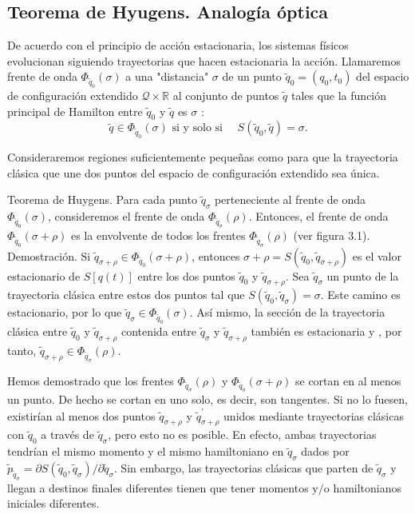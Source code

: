 \subsection{Teorema de Hyugens. Analogía óptica}
De acuerdo con el principio de acción estacionaria, los sistemas físicos evolucionan siguiendo trayectorias que hacen estacionaria la acción. Llamaremos frente de onda $\Phi_{\tilde{q}_{0}}(\sigma)$ a una "distancia" $\sigma$ de un punto $\tilde{q}_{0}=\left(q_{0}, t_{0}\right)$ del espacio de configuración extendido $\mathscr{Q} \times \mathbb{R}$ al conjunto de puntos $\tilde{q}$ tales que la función principal de Hamilton entre $\tilde{q}_{0}$ y $\tilde{q}$ es $\sigma$ :
$$
\tilde{q} \in \Phi_{\tilde{q}_{0}}(\sigma) \text { si y solo si } \quad S\left(\tilde{q}_{0}, \tilde{q}\right)=\sigma .
$$

Consideraremos regiones suficientemente pequeñas como para que la trayectoria clásica que une dos puntos del espacio de configuración extendido sea única.

Teorema de Huygens. Para cada punto $\tilde{q}_{\sigma}$ perteneciente al frente de onda $\Phi_{\tilde{q}_{0}}(\sigma)$, consideremos el frente de onda $\Phi_{\tilde{q}_{\sigma}}(\rho)$. Entonces, el frente de onda $\Phi_{\tilde{q}_{0}}(\sigma+\rho)$ es la envolvente de todos los frentes $\Phi_{\tilde{q}_{\sigma}}(\rho)$ (ver figura 3.1).
Demostración. Si $\tilde{q}_{\sigma+\rho} \in \Phi_{\tilde{q}_{0}}(\sigma+\rho)$, entonces $\sigma+\rho=S\left(\tilde{q}_{0}, \tilde{q}_{\sigma+\rho}\right)$ es el valor estacionario de $S[q(t)]$ entre los dos puntos $\tilde{q}_{0}$ y $\tilde{q}_{\sigma+\rho}$. Sea $\tilde{q}_{\sigma}$ un punto de la
trayectoria clásica entre estos dos puntos tal que $S\left(\tilde{q}_{0}, \tilde{q}_{\sigma}\right)=\sigma$. Este camino es estacionario, por lo que $\tilde{q}_{\sigma} \in \Phi_{\tilde{q}_{0}}(\sigma)$. Así mismo, la sección de la trayectoria clásica entre $\tilde{q}_{0}$ y $\tilde{q}_{\sigma+\rho}$ contenida entre $\tilde{q}_{\sigma}$ y $\tilde{q}_{\sigma+\rho}$ también es estacionaria y , por tanto, $\tilde{q}_{\sigma+\rho} \in \Phi_{\tilde{q}_{\sigma}}(\rho)$.

Hemos demostrado que los frentes $\Phi_{\tilde{q}_{\sigma}}(\rho)$ y $\Phi_{\tilde{q}_{0}}(\sigma+\rho)$ se cortan en al menos un punto. De hecho se cortan en uno solo, es decir, son tangentes. Si no lo fuesen, existirían al menos dos puntos $\tilde{q}_{\sigma+\rho}$ y $\tilde{q}_{\sigma+\rho}^{\prime}$ unidos mediante trayectorias clásicas con $\tilde{q}_{0}$ a través de $\tilde{q}_{\sigma}$, pero esto no es posible. En efecto, ambas trayectorias tendrían el mismo momento y el mismo hamiltoniano en $\tilde{q}_{\sigma}$ dados por $\tilde{p}_{\tilde{q}_{\sigma}}=\partial S\left(\tilde{q}_{0}, \tilde{q}_{\sigma}\right) / \partial \tilde{q}_{\sigma}$. Sin embargo, las trayectorias clásicas que parten de $\tilde{q}_{\sigma}$ y llegan a destinos finales diferentes tienen que tener momentos $\mathrm{y} / \mathrm{o}$ hamiltonianos iniciales diferentes.
